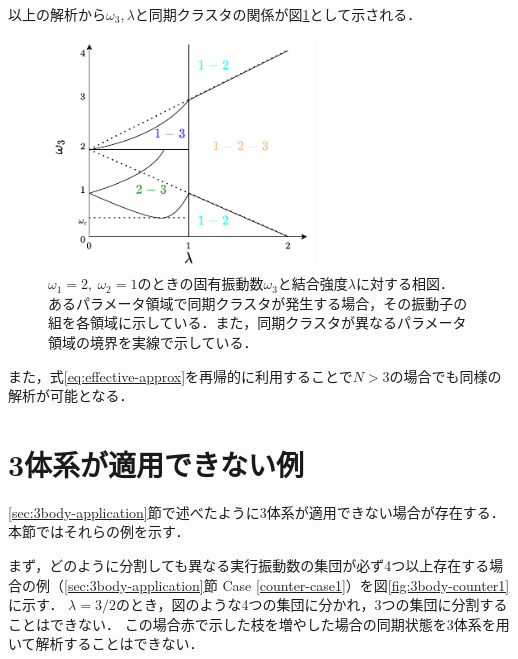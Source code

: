 \documentclass[../main]{subfiles}
\begin{document}
以上の解析から$\omega_3,\lambda$と同期クラスタの関係が図\ref{fig:appendix-bifurcation}として示される．

\begin{figure}[t]
\centering
\includegraphics[width=70mm]{./images/appendix-bifurcation.pdf}
\centering
\caption{$\omega_1=2,\ \omega_2=1$のときの固有振動数$\omega_3$と結合強度$\lambda$に対する相図．
あるパラメータ領域で同期クラスタが発生する場合，その振動子の組を各領域に示している．また，同期クラスタが異なるパラメータ領域の境界を実線で示している．}
\label{fig:appendix-bifurcation}
\end{figure}

また，式\eqref{eq:effective-approx}を再帰的に利用することで$N>3$の場合でも同様の解析が可能となる．

\chapter{3体系が適用できない例}
\label{chap:appendix-counter}
\ref{sec:3body-application}節で述べたように3体系が適用できない場合が存在する．
本節ではそれらの例を示す．

まず，どのように分割しても異なる実行振動数の集団が必ず4つ以上存在する場合の例（\ref{sec:3body-application}節 Case \ref{counter-case1}）を図\ref{fig:3body-counter1}に示す．
$\lambda=3/2$のとき，図のような4つの集団に分かれ，3つの集団に分割することはできない．
この場合赤で示した枝を増やした場合の同期状態を3体系を用いて解析することはできない．
\end{document}
